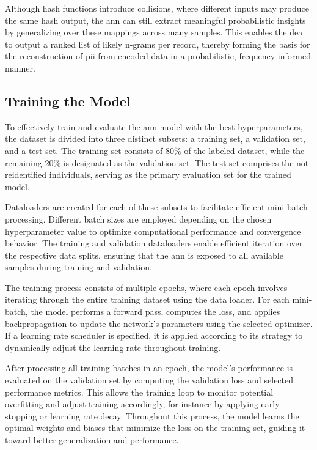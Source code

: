 Although hash functions introduce collisions, where different inputs may produce the same hash output, the \ac{ann} can still extract meaningful probabilistic insights by generalizing over these mappings across many samples.
This enables the \ac{dea} to output a ranked list of likely n-grams per record, thereby forming the basis for the reconstruction of \ac{pii} from encoded data in a probabilistic, frequency-informed manner.

\subsection{Training the Model} \label{sec:training}

To effectively train and evaluate the \ac{ann} model with the best hyperparameters, the dataset is divided into three distinct subsets: a training set, a validation set, and a test set.
The training set consists of 80\% of the labeled dataset, while the remaining 20\% is designated as the validation set.
The test set comprises the not-reidentified individuals, serving as the primary evaluation set for the trained model.

Dataloaders are created for each of these subsets to facilitate efficient mini-batch processing.
Different batch sizes are employed depending on the chosen hyperparameter value to optimize computational performance and convergence behavior.
The training and validation dataloaders enable efficient iteration over the respective data splits, ensuring that the \ac{ann} is exposed to all available samples during training and validation.

The training process consists of multiple epochs, where each epoch involves iterating through the entire training dataset using the data loader.
For each mini-batch, the model performs a forward pass, computes the loss, and applies backpropagation to update the network’s parameters using the selected optimizer.
If a learning rate scheduler is specified, it is applied according to its strategy to dynamically adjust the learning rate throughout training.

After processing all training batches in an epoch, the model’s performance is evaluated on the validation set by computing the validation loss and selected performance metrics.
This allows the training loop to monitor potential overfitting and adjust training accordingly, for instance by applying early stopping or learning rate decay.
Throughout this process, the model learns the optimal weights and biases that minimize the loss on the training set, guiding it toward better generalization and performance.


